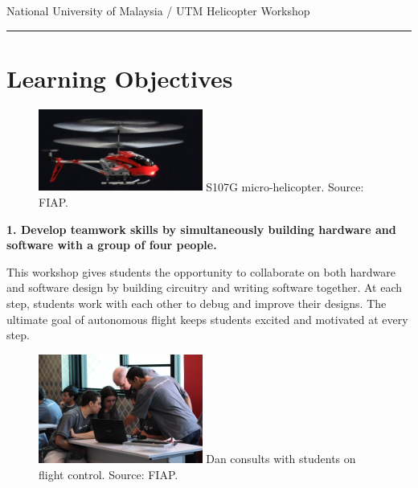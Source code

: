 \documentclass[11pt]{article}
\begin{document}
\thispagestyle{empty}
\pagestyle{empty}

{\LARGE National University of Malaysia / UTM Helicopter Workshop}
\hrule

\section*{Learning Objectives}

\begin{figure}
    \begin{center}
    \includegraphics[width=0.48\textwidth]{figures/S107G.jpg}
    {\small S107G micro-helicopter. Source: FIAP.}
    \end{center}
    \vspace{-20pt}
\end{figure}
\textbf{1. Develop teamwork skills by simultaneously building hardware and software with a group of four people.}

This workshop gives students the opportunity to collaborate on both hardware and software design by building circuitry and writing software together.  At each step, students work with each other to debug and improve their designs.  The ultimate goal of autonomous flight keeps students excited and motivated at every step.

\vspace{20pt}
\begin{figure}
    \begin{center}
    \includegraphics[width=0.48\textwidth]{figures/fiap_workshop_dan.jpg}
    {\small Dan consults with students on flight control.  Source: FIAP.}
    \end{center}
    \vspace{-20pt}
\end{figure}
\end{document}
